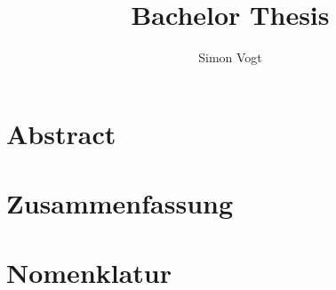 \documentclass[a4paper, headinclude, footinclude, headsepline, 12pt, DIV=calc, BCOR5mm]{scrreprt}
\begin{document}
\author{Simon Vogt}
\title{Bachelor Thesis}
\chapter*{Abstract}
\chapter*{Zusammenfassung}
\tableofcontents
\chapter*{Nomenklatur}
\listoffigures
\listoftables






\printbibliography
\end{document}
